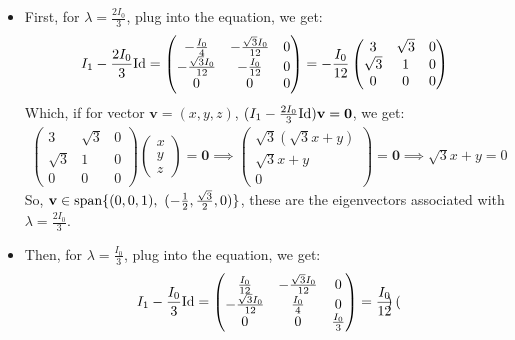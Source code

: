 \documentclass{article}
\newcommand{\Id}{\textmd{Id}} %
\newcommand{\bv}{\textbf{v}} %
\newcommand{\bzero}{\textbf{0}}
\begin{document}
\begin{itemize}
    \item First, for $\lambda=\frac{2I_0}{3}$, plug into the equation, we get:
    \begin{align}
        I_1-\frac{2I_0}{3}\Id = \begin{pmatrix}
            -\frac{I_0}{4}& -\frac{\sqrt{3}I_0}{12} & 0\\
            -\frac{\sqrt{3}I_0}{12} & -\frac{I_0}{12}& 0\\
            0&0&0
        \end{pmatrix} = -\frac{I_0}{12}\begin{pmatrix}
            3&\sqrt{3}&0\\
            \sqrt{3}&1&0\\
            0&0&0
        \end{pmatrix}
    \end{align}
    Which, if for vector $\bv=(x,y,z)$, $(I_1-\frac{2I_0}{3}\Id)\bv = \bzero$, we get:
    \begin{align}
        \begin{pmatrix}
            3&\sqrt{3}&0\\
            \sqrt{3}&1&0\\
            0&0&0
        \end{pmatrix}\begin{pmatrix}
            x\\y\\z
        \end{pmatrix}=\bzero \implies \begin{pmatrix}
            \sqrt{3}(\sqrt{3}x+y)\\ \sqrt{3}x+y\\ 0
        \end{pmatrix} = \bzero \implies \sqrt{3}x+y=0
    \end{align}
    So, $\bv \in \textmd{span}\{(0,0,1),\ (-\frac{1}{2},\frac{\sqrt{3}}{2},0)\}$, these are the eigenvectors associated with $\lambda=\frac{2I_0}{3}$.
    \item Then, for $\lambda=\frac{I_0}{3}$, plug into the equation, we get:
    \begin{align}
        I_1-\frac{I_0}{3}\Id = \begin{pmatrix}
            \frac{I_0}{12}&-\frac{\sqrt{3}I_0}{12}&0\\
            -\frac{\sqrt{3}I_0}{12}&\frac{I_0}{4}&0\\
            0&0&\frac{I_0}{3}
        \end{pmatrix}=\frac{I_0}{12}\begin{pmatrix}

\end{pmatrix}
\end{align}
\end{itemize}
\end{document}
